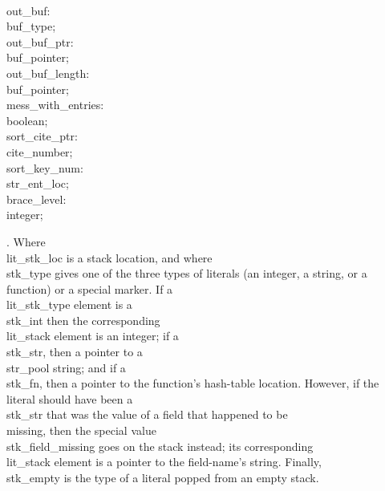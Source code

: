 \4\\{out\_buf}: \\{buf\_type};\6
\4\\{out\_buf\_ptr}: \\{buf\_pointer};\6
\4\\{out\_buf\_length}: \\{buf\_pointer};\6
\4\\{mess\_with\_entries}: \\{boolean};\6
\4\\{sort\_cite\_ptr}: \\{cite\_number};\6
\4\\{sort\_key\_num}: \\{str\_ent\_loc};\6
\4\\{brace\_level}: \\{integer};%
\par
\fi

.
Where \\{lit\_stk\_loc} is a stack location, and where \\{stk\_type} gives
one of the three types of literals (an integer, a string, or a
function) or a special marker.  If a \\{lit\_stk\_type} element is a
\\{stk\_int} then the corresponding \\{lit\_stack} element is an integer; if
a \\{stk\_str}, then a pointer to a \\{str\_pool} string; and if a \\{stk\_fn},
then a pointer to the function's hash-table location.  However, if the
literal should have been a \\{stk\_str} that was the value of a field
that happened to be \\{missing}, then the special value
\\{stk\_field\_missing} goes on the stack instead; its corresponding
\\{lit\_stack} element is a pointer to the field-name's string.  Finally,
\\{stk\_empty} is the type of a literal popped from an empty stack.

